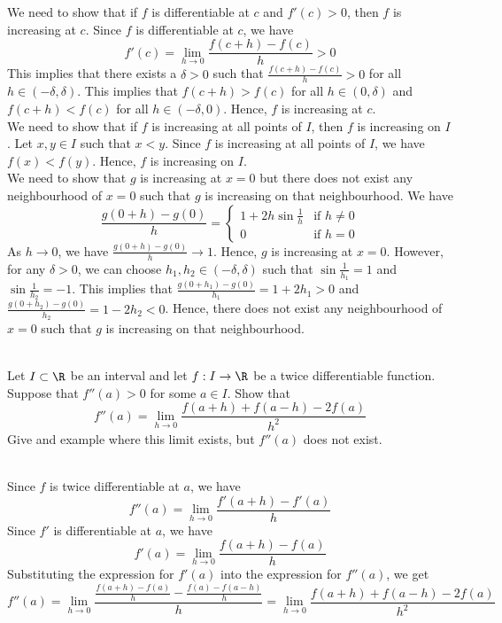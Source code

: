 \documentclass[openany]{book}
\begin{document}
 We need to show that if $f$ is differentiable at $c$ and $f'(c) > 0$, then $f$ is increasing at $c$. Since $f$ is differentiable at $c$, we have
\[
    f'(c) = \lim_{h \to 0} \frac{f(c + h) - f(c)}{h} > 0
\]
This implies that there exists a $\delta > 0$ such that $\frac{f(c + h) - f(c)}{h} > 0$ for all $h \in (-\delta, \delta)$. This implies that $f(c + h) > f(c)$ for all $h \in (0, \delta)$ and $f(c + h) < f(c)$ for all $h \in (-\delta, 0)$. Hence, $f$ is increasing at $c$. \\
We need to show that if $f$ is increasing at all points of $I$, then $f$ is increasing on $I$. Let $x, y \in I$ such that $x < y$. Since $f$ is increasing at all points of $I$, we have $f(x) < f(y)$. Hence, $f$ is increasing on $I$. \\
We need to show that $g$ is increasing at $x = 0$ but there does not exist any neighbourhood of $x = 0$ such that $g$ is increasing on that neighbourhood. We have
\[
    \frac{g(0 + h) - g(0)}{h} = \begin{cases}
    1 + 2h \sin{\frac{1}{h}} & \text{if } h \neq 0 \\
    0 & \text{if } h = 0
    \end{cases}
\]
As $h \to 0$, we have $\frac{g(0 + h) - g(0)}{h} \to 1$. Hence, $g$ is increasing at $x = 0$. However, for any $\delta > 0$, we can choose $h_1, h_2 \in (-\delta, \delta)$ such that $\sin{\frac{1}{h_1}} = 1$ and $\sin{\frac{1}{h_2}} = -1$. This implies that $\frac{g(0 + h_1) - g(0)}{h_1} = 1 + 2h_1 > 0$ and $\frac{g(0 + h_2) - g(0)}{h_2} = 1 - 2h_2 < 0$. Hence, there does not exist any neighbourhood of $x = 0$ such that $g$ is increasing on that neighbourhood. \\\\
\begin{exercise}
    Let $I \subset \R$ be an interval and let $f: I \to \R$ be a twice differentiable function. Suppose that $f''(a) > 0$ for some $a \in I$. Show that 
    \[ f''(a) = \lim_{h \to 0} \frac{f(a + h) + f(a - h) - 2f(a)}{h^2} \]
    Give and example where this limit exists, but $f''(a)$ does not exist.
\end{exercise} \\
 Since $f$ is twice differentiable at $a$, we have
\[ f''(a) = \lim_{h \to 0} \frac{f'(a + h) - f'(a)}{h} \]
Since $f'$ is differentiable at $a$, we have
\[ f'(a) = \lim_{h \to 0} \frac{f(a + h) - f(a)}{h} \]
Substituting the expression for $f'(a)$ into the expression for $f''(a)$, we get
\[
    f''(a) = \lim_{h \to 0} \frac{\frac{f(a + h) - f(a)}{h} - \frac{f(a) - f(a - h)}{h}}{h} = \lim_{h \to 0} \frac{f(a + h) + f(a - h) - 2f(a)}{h^2}
\]
\end{document}
